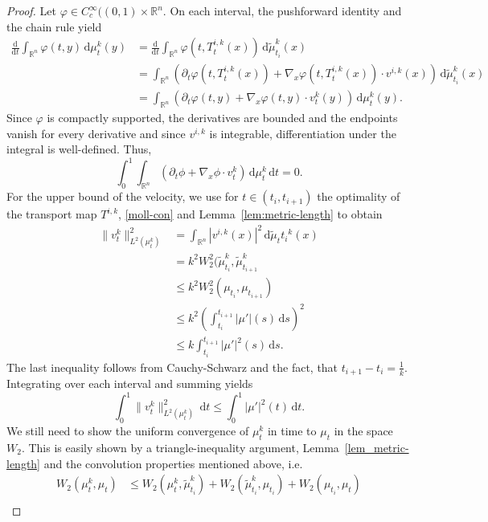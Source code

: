 \begin{proof}
Let $\varphi\in C_c^\infty((0,1)\times \mathbb{R}^n$. On each interval, the pushforward identity and the chain rule yield
\begin{align*}
	\frac{\mathrm d}{\mathrm dt}\int_{\mathbb{R}^n}\varphi(t,y)\,\mathrm d\mu_t^k(y) &= \frac{\mathrm d}{\mathrm dt}\int_{\mathbb{R}^n}\varphi(t,T_t^{i,k}(x))\,\mathrm d\widetilde\mu_{t_i}^k(x)\\
																						   &=\int_{\mathbb{R}^n}\left(\partial_t\varphi(t,T_t^{i,k}(x)) + \nabla_x\varphi(t,T_t^{i,k}(x))\cdot v^{i,k}(x)\right)\,\mathrm d\widetilde\mu_{t_i}^k(x)\\
																						   &=\int_{\mathbb{R}^n}\left(\partial_t\varphi(t,y) + \nabla_x\varphi(t,y)\cdot v_t^k(y)\right)\,\mathrm d\mu_t^k(y).
\end{align*}
Since $\varphi$ is compactly supported, the derivatives are bounded and the endpoints vanish for every derivative and since $v^{i,k}$ is integrable, differentiation under the integral is well-defined. Thus,
$$
\int_0^1\int_{\mathbb{R}^n}(\partial_t\phi+\nabla_x\phi\cdot v_t^k)\,\mathrm d\mu_t^k\,\mathrm dt=0.
$$
For the upper bound of the velocity, we use for $t\in(t_i,t_{i+1})$ the optimality of the transport map $T^{i,k}$, \eqref{moll-con} and Lemma~\ref{lem:metric-length} to obtain
\begin{align*}
	\lVert v_t^k\rVert_{L^2(\mu_t^k)}^2
	&= \int_{\mathbb{R}^n}|v^{i,k}(x)|^2\,\mathrm d\widetilde\mu_t{t_i}^k(x)\\
	&=k^2W_2^2(\widetilde\mu_{t_i}^k,\widetilde\mu_{t_{i+1}}^k\\
	&\leq k^2W_2^2(\mu_{t_i},\mu_{t_{i+1}})\\
	&\leq k^2\left(\int_{t_i}^{t_{i+1}}|\mu'|(s)\,\mathrm ds\right)^2\\
	&\leq k\int_{t_i}^{t_{i+1}}|\mu'|^2(s)\,\mathrm ds.
\end{align*}
The last inequality follows from Cauchy-Schwarz and the fact, that $t_{i+1}-t_i=\frac{1}{k}$. Integrating over each interval and summing yields
\begin{equation*}
	\int_0^1 \lVert v_t^k\rVert_{L^2(\mu_t^k)}^2\,\mathrm dt\leq \int_0^1|\mu'|^2(t)\,\mathrm dt.
\end{equation*}
We still need to show the uniform convergence of $\mu_t^k$ in time to $\mu_t$ in the space $W_2$. This is easily shown by a triangle-inequality argument, Lemma~\ref{lem_metric-length} and the convolution properties mentioned above, i.e.
\begin{align*}
	W_2(\mu_t^k,\mu_t) &\leq W_2(\mu_t^k,\widetilde\mu_{t_i}^k) + W_2(\widetilde\mu_{t_i}^k,\mu_{t_i})+W_2(\mu_{t_i},\mu_t)\\

\end{align*}
\end{proof}
